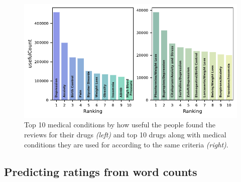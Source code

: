 \documentclass{article}
\begin{document}
\begin{figure}[h!]
\includegraphics{plots/top_conditions.pdf}
\caption{Top 10 medical conditions by how useful the people found the reviews for their drugs \textit{(left)} and top 10 drugs along with medical conditions they are used for according to the same criteria \textit{(right)}.}
\label{fig:bars}
\centering
\end{figure}

\subsection{Predicting ratings from word counts}
\end{document}

